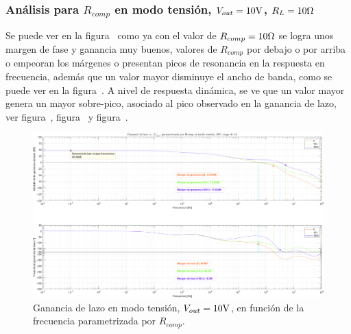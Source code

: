 
\subsubsection{Análisis para $R_{comp}$ en modo tensión, $V_{out} = 10 \si[per-mode=symbol]{\volt}$, $R_{L} = 10 \si[per-mode=symbol]{\ohm}$}

Se puede ver en la figura~ como ya con el valor de $R_{comp} = 10 \si[per-mode=symbol]{\ohm}$ se logra unos margen de fase y ganancia muy buenos, valores de $R_{comp}$ por debajo o por arriba o empeoran los márgenes o presentan picos de resonancia en la respuesta en frecuencia, además que un valor mayor disminuye el ancho de banda, como se puede ver en la figura~. A nivel de respuesta dinámica, se ve que un valor mayor genera un mayor sobre-pico, asociado al pico observado en la ganancia de lazo, ver figura~, figura~ y figura~.

\vfill



\clearpage

\begin{figure}[H] %
\begin{center}
\includegraphics[width=1.1 \textwidth, angle=90]{./img/plots/loop/power_supply_RCOMP_LOOP_Modo1.png}
\caption{\label{fig:fig_power_supply_RCOMP_LOOP_Modo1}\footnotesize{Ganancia de lazo en modo tensión, $V_{out} = 10 \si[per-mode=symbol]{\volt}$, en función de la frecuencia parametrizada por $R_{comp}$.}}
\end{center}
\end{figure}



